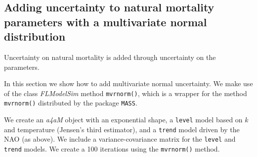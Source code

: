 \documentclass[a4paper,english,10pt]{article}\usepackage[]{graphicx}\usepackage[]{color}
\newcommand{\code}[1]{{\texttt{#1}}}
\newcommand{\pkg}[1]{{\texttt{#1}}}
\newcommand{\class}[1]{{\textit{#1}}}
\begin{document}
\subsection{Adding uncertainty to natural mortality parameters with a multivariate normal distribution}

Uncertainty on natural mortality is added through uncertainty on the parameters.

In this section we show how to add multivariate normal uncertainty. We make use of the class \class{FLModelSim} method \code{mvrnorm()}, which is a wrapper for the method \code{mvrnorm()} distributed by the package \pkg{MASS}.

We create an \class{a4aM} object with an exponential shape, a \code{level} model based on $k$ and temperature (Jensen's third estimator), and a \code{trend} model driven by the NAO (as above). We include a variance-covariance matrix for the \code{level} and \code{trend} models. We create a 100 iterations using the \code{mvrnorm()} method.
\end{document}
